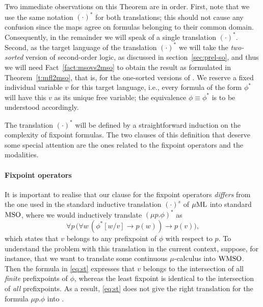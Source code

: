 Two immediate observations on this Theorem are in order.
First, note that we use the same notation $(\cdot)^{*}$ for both translations; 
this should not cause any confusion since the maps agree on formulas belonging 
to their common domain.
Consequently, in the remainder we will speak of a single translation 
$(\cdot)^{*}$.
Second, as the target language of the translation $(\cdot)^{*}$ we will take 
the \emph{two-sorted} version of second-order logic, as discussed in 
section~\ref{sec:prel-so}, and thus we will need Fact~\ref{fact:msovs2mso}
to obtain the result as formulated in Theorem~\ref{t:mfl2mso}, that is,
for the one-sorted versions of \mso.
We reserve a fixed individual variable $v$ for this target language, i.e., 
every formula of the form $\phi^{*}$ will have this $v$ as its unique free 
variable; the equivalence $\phi \equiv \phi^{*}$ is to be understood accordingly.

The translation $(\cdot)^{*}$ will be defined by a straightforward induction on
the complexity of fixpoint formulas.
The two clauses of this definition that deserve some special attention are the
ones related to the fixpoint operators and the modalities.

\paragraph{Fixpoint operators} 
It is important to realise that our clause for the fixpoint operators
\emph{differs} from the one used in the standard inductive translation 
$(\cdot)^{s}$ of $\mu\mathrm{ML}$ into standard $\mathrm{MSO}$, where we would inductively
translate $(\mu p. \phi)^{*}$ as
\begin{equation}
\label{eq:st}
\forall p\, \big( \forall w\, (\phi^{*}[w/v] \to p(w)) \to p(v) \big),
\end{equation}
which states that $v$ belongs to any prefixpoint of $\phi$ with respect to $p$.
To understand the problem with this translation in the current context, suppose,
for instance, that we want to translate some continuous $\mu$-calculus into
$\mathrm{WMSO}$.
Then the formula in \eqref{eq:st} expresses that $v$ 
belongs to the intersection of all \emph{finite} prefixpoints of $\phi$, whereas
the least fixpoint is identical to the intersection of \emph{all} prefixpoints.
As a result, \eqref{eq:st} does not give the right translation for the formula 
$\mu p.\phi$ into \wmso.

